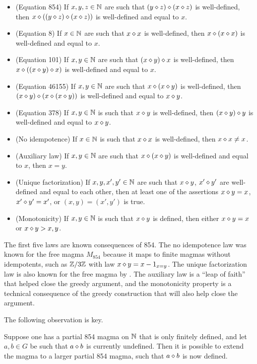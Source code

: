 \begin{itemize}
  \item (Equation 854)  If $x,y,z \in \mathbb{N}$ are such that $(y \diamond z) \diamond (x \diamond z)$ is well-defined, then $x \diamond ((y \diamond z) \diamond (x \diamond z))$ is well-defined and equal to $x$.
  \item (Equation 8) If $x \in \mathbb{N}$ are such that $x \diamond x$ is well-defined, then $x \diamond (x \diamond x)$ is well-defined and equal to $x$.
  \item (Equation 101)  If $x,y \in \mathbb{N}$ are such that $(x \diamond y) \diamond x$ is well-defined, then $x \diamond ((x \diamond y) \diamond x)$ is well-defined and equal to $x$.
  \item (Equation 46155) If $x,y \in \mathbb{N}$ are such that $x \diamond (x \diamond y)$ is well-defined, then $(x \diamond y) \diamond (x \diamond (x \diamond y))$ is well-defined and equal to $x \diamond y$.
  \item (Equation 378) If $x,y \in \mathbb{N}$ is such that $x \diamond y$ is well-defined, then $(x \diamond y) \diamond y$ is well-defined and equal to $x \diamond y$.
  \item (No idempotence)  If $x \in \mathbb{N}$ is such that $x \diamond x$ is well-defined, then $x \diamond x \neq x$.
  \item (Auxiliary law)  If $x,y \in \mathbb{N}$ are such that $x \diamond (x \diamond y)$ is well-defined and equal to $x$, then $x=y$.
  \item (Unique factorization)  If $x,y,x',y' \in \mathbb{N}$ are such that $x \diamond y$, $x' \diamond y'$ are well-defined and equal to each other, then at least one of the assertions $x \diamond y = x$, $x' \diamond y' = x'$, or $(x,y) = (x',y')$ is true.
  \item (Monotonicity)  If $x,y \in \mathbb{N}$ is such that $x \diamond y$ is defined, then either $x \diamond y = x$ or $x \diamond y > x, y$.
\end{itemize}

The first five laws are known consequences of 854.  The no idempotence law was known for the free magma $M_{854}$ because it maps to finite magmas without idempotents, such as $\mathbb{Z}/3\mathbb{Z}$ with law $x \diamond y = x - 1_{x=y}$.  The unique factorization law is also known for the free magma by .  The auxiliary law is a ``leap of faith'' that helped close the greedy argument, and the monotonicity property is a technical consequence of the greedy construction that will also help close the argument.

The following observation is key.

\begin{proposition}\label{854-extend}\leanok{}  Suppose one has a partial 854 magma on $\mathbb{N}$ that is only finitely defined, and let $a,b \in G$ be such that $a \diamond b$ is currently undefined.  Then it is possible to extend the magma to a larger partial 854 magma, such that $a \diamond b$ is now defined.
\end{proposition}

